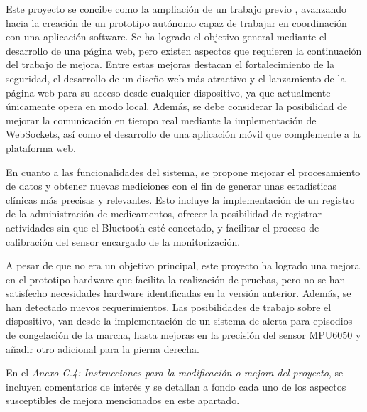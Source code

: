 
Este proyecto se concibe como la ampliación de un trabajo previo \cite{saragonz91:online}, avanzando hacia la creación de un prototipo autónomo capaz de trabajar en coordinación con una aplicación software. Se ha logrado el objetivo general mediante el desarrollo de una página web, pero existen aspectos que requieren la continuación del trabajo de mejora. Entre estas mejoras destacan el fortalecimiento de la seguridad, el desarrollo de un diseño web más atractivo y el lanzamiento de la página web para su acceso desde cualquier dispositivo, ya que actualmente únicamente opera en modo local. Además, se debe considerar la posibilidad de mejorar la comunicación en tiempo real mediante la implementación de WebSockets, así como el desarrollo de una aplicación móvil que complemente a la plataforma web.

En cuanto a las funcionalidades del sistema, se propone mejorar el procesamiento de datos y obtener nuevas mediciones con el fin de generar unas estadísticas clínicas más precisas y relevantes. Esto incluye la implementación de un registro de la administración de medicamentos, ofrecer la posibilidad de registrar actividades sin que el Bluetooth esté conectado, y facilitar el proceso de calibración del sensor encargado de la monitorización.

A pesar de que no era un objetivo principal, este proyecto ha logrado una mejora en el prototipo hardware que facilita la realización de pruebas, pero no se han satisfecho necesidades hardware identificadas en la versión anterior. Además, se han detectado nuevos requerimientos. Las posibilidades de trabajo sobre el dispositivo, van desde la implementación de un sistema de alerta para episodios de congelación de la marcha, hasta mejoras en la precisión del sensor MPU6050 y añadir otro adicional para la pierna derecha.

En el \textit{Anexo C.4: Instrucciones para la modificación o mejora del proyecto}, se incluyen comentarios de interés y se detallan a fondo cada uno de los aspectos susceptibles de mejora mencionados en este apartado.